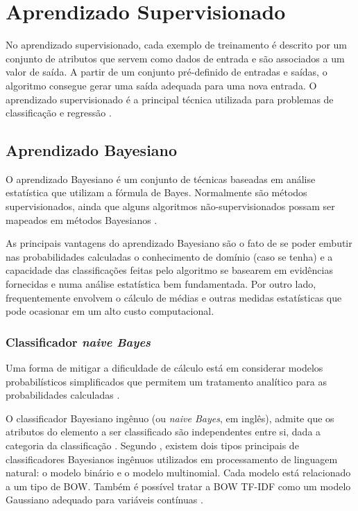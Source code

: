 \section{Aprendizado Supervisionado}

No aprendizado supervisionado, cada exemplo de treinamento é descrito por um conjunto de atributos que servem como dados de entrada e são associados a um valor de saída. A partir de um conjunto pré-definido de entradas e saídas, o algoritmo consegue gerar uma saída adequada para uma nova entrada. O aprendizado supervisionado é a principal técnica utilizada para problemas de classificação e regressão \cite{mohri2012}.

\subsection{Aprendizado Bayesiano}

O aprendizado Bayesiano é um conjunto de técnicas baseadas em análise estatística que utilizam a fórmula de Bayes. Normalmente são métodos supervisionados, ainda que alguns algoritmos não-supervisionados possam ser mapeados em métodos Bayesianos \cite{mitchell1997}.

As principais vantagens do aprendizado Bayesiano são o fato de se poder embutir nas probabilidades calculadas o conhecimento de domínio (caso se tenha) e a capacidade das classificações feitas pelo algoritmo se basearem em evidências fornecidas e numa análise estatística bem fundamentada. Por outro lado, frequentemente envolvem o cálculo de médias e outras medidas estatísticas que pode ocasionar em um alto custo computacional.

\subsubsection{Classificador \textit{naive Bayes}}

Uma forma de mitigar a dificuldade de cálculo está em considerar modelos probabilísticos simplificados que permitem um tratamento analítico para as probabilidades calculadas \cite{pardo2002}.

O classificador Bayesiano ingênuo (ou \textit{naive Bayes}, em inglês), admite que os atributos do elemento a ser classificado são independentes entre si, dada a categoria da classificação \cite{pellucci2011}. Segundo , existem dois tipos principais de classificadores Bayesianos ingênuos utilizados em processamento de linguagem natural: o modelo binário e o modelo multinomial. Cada modelo está relacionado a um tipo de BOW. Também é possível tratar a BOW TF-IDF como um modelo Gaussiano adequado para variáveis contínuas \cite{hand2001}.

